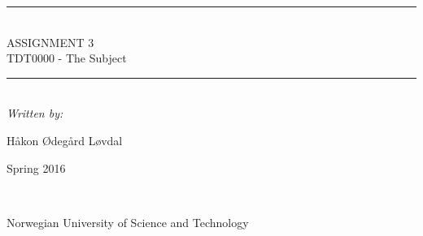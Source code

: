 \thispagestyle{empty}
\begin{center}
\noindent\rule{\textwidth}{0.5pt}
\\[1pc]
\Huge{ASSIGNMENT 3}
\\[1pc]
\large{TDT0000 - The Subject}
\\[1pc]
\noindent\rule{\textwidth}{0.5pt}
\\[5pc]
\textit{Written by:}
\\[1pc]
\begin{small}
Håkon Ødegård Løvdal \\ [7pc]
\end{small}
\begin{bf}
Spring 2016
\end{bf}
\\[8pc]

\noindent{}

\begin{small}Norwegian University of Science and Technology\end{small}

\end{center}

\pagebreak